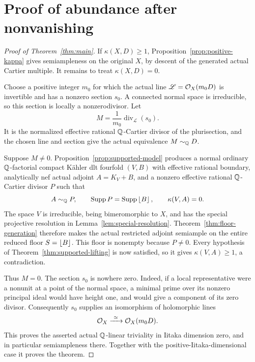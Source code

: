 \section{Proof of abundance after nonvanishing}\label{sec:completion}

\begin{proof}[Proof of Theorem~\ref{thm:main}]
If \(\kappa(X,D)\geq1\), Proposition~\ref{prop:positive-kappa} gives
semiampleness on the original \(X\), by descent of the generated actual
Cartier multiple.  It remains to treat \(\kappa(X,D)=0\).

Choose a positive integer \(m_0\) for which the actual line
\(\mathscr L=\mathcal O_X(m_0D)\) is invertible and has a nonzero section
\(s_0\).  A connected normal space is irreducible, so this section is
locally a nonzerodivisor.  Let
\[
 M=\frac1{m_0}\operatorname{div}_{\mathscr L}(s_0).
\]
It is the normalized effective rational \(\mathbb Q\)-Cartier divisor of the
plurisection, and the chosen line and section give the actual equivalence
\(M\sim_\mathbb Q D\).

Suppose \(M\ne0\).  Proposition~\ref{prop:supported-model} produces a
normal ordinary \(\mathbb Q\)-factorial compact K\"ahler dlt fourfold \((V,B)\)
with effective rational boundary, analytically nef actual adjoint
\(A=K_V+B\), and a nonzero effective rational \(\mathbb Q\)-Cartier divisor
\(P\) such that
\[
 A\sim_\mathbb Q P,\qquad \operatorname{Supp} P=\operatorname{Supp}\left\lfloor B\right\rfloor,\qquad \kappa(V,A)=0.
\]
The space \(V\) is irreducible, being bimeromorphic to \(X\), and has
the special projective resolution in Lemma~\ref{lem:special-resolution}.
Theorem~\ref{thm:floor-generation} therefore makes the actual restricted
adjoint semiample on the entire reduced floor \(S=\left\lfloor B\right\rfloor\).  This
floor is nonempty because \(P\ne0\).  Every hypothesis of
Theorem~\ref{thm:supported-lifting} is now satisfied, so it gives
\(\kappa(V,A)\geq1\), a contradiction.

Thus \(M=0\).  The section \(s_0\) is nowhere zero.  Indeed, if a local
representative were a nonunit at a point of the normal space, a minimal
prime over its nonzero principal ideal would have height one, and would
give a component of its zero divisor.  Consequently \(s_0\) supplies
an isomorphism of holomorphic lines
\[
 \OO_X\xrightarrow{\ \simeq\ }\OO_X(m_0D).
\]
This proves the asserted actual \(\mathbb Q\)-linear triviality in Iitaka
dimension zero, and in particular semiampleness there.  Together with
the positive-Iitaka-dimensional case it proves the theorem.
\end{proof}
